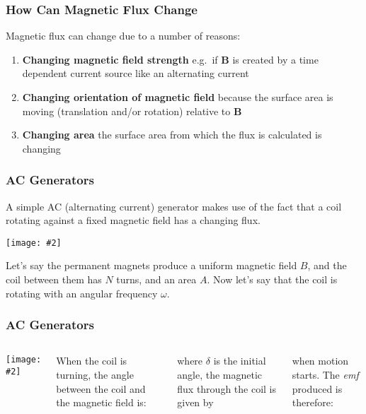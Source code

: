 \documentclass[12pt,aspectratio=169]{beamer}
\newcommand{\pic}[2]{\texttt{[image: \#2]}}
\newcommand{\mb}[1]{\mathbf{#1}}
\newcommand{\eq}[2]{\vspace{#1}{\Large\begin{displaymath}#2\end{displaymath}}}
\begin{document}


\begin{frame}
  \frametitle{How Can Magnetic Flux Change}
  Magnetic flux can change due to a number of reasons:
  \begin{enumerate}
  \item\textbf{Changing magnetic field strength} e.g.\  if $\mb{B}$ is created
    by a time dependent current source like an alternating current
  \item\textbf{Changing orientation of magnetic field} because the
    surface area is moving (translation and/or rotation) relative to $\mb{B}$
  \item\textbf{Changing area} the surface area from which the flux is
    calculated is changing
  \end{enumerate}
\end{frame}

\begin{frame}
  \frametitle{AC Generators}
  A simple AC (alternating current) generator makes use of the fact that a 
  coil rotating against a fixed magnetic field has a changing flux.
  \begin{center}
    \pic{.45}{generator.png}
  \end{center}
  Let's say the permanent magnets produce a uniform magnetic field $B$, and the
  coil between them has $N$ turns, and an area $A$. Now let's say that the coil
  is rotating with an angular frequency $\omega$.
\end{frame}

\begin{frame}
  \frametitle{AC Generators}
  \begin{columns}
    \pic{1}{generator.png}

    When the coil is turning, the angle between the coil and the magnetic field
    is:
    
    \eq{-.3in}{ \theta=\omega t+\delta} 

    \vspace{-.2in}where $\delta$ is the initial angle, the magnetic flux
    through the coil is given by
    
    \eq{-.4in}{\Phi=NBA\cos\theta=NBA\cos(\omega t+\delta)}

    \vspace{-.25in} when motion starts. The \emph{emf} produced is therefore:

    \eq{-.35in}{
      \mathcal{E}=-\frac{d\Phi}{dt}=-NBA\omega\sin(\omega t+\delta)
    }
  \end{columns}
\end{frame}
\end{document}
